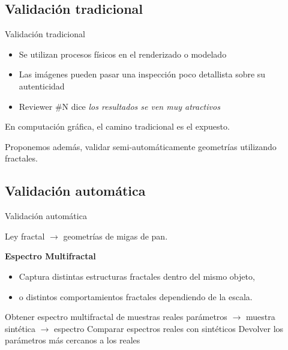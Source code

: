 \documentclass[spanish,unknownkeysallowed]{beamer}
\begin{document}
\subsection{Validación tradicional}
\begin{frame}{Validación tradicional}
\begin{itemize}
\item Se utilizan procesos físicos en el renderizado o modelado
\item Las imágenes pueden pasar una inspección poco detallista sobre su autenticidad
\item Reviewer \#N dice \it{los resultados se ven muy atractivos}
\end{itemize}

En computación gráfica, el camino tradicional es el expuesto.

Proponemos además, validar semi-automáticamente geometrías utilizando fractales.

\end{frame}

\subsection{Validación automática}

\begin{frame}{Validación automática}

Ley fractal $\rightarrow$ geometrías de migas de pan.

\textbf{Espectro Multifractal}

\begin{itemize}
\item Captura distintas estructuras fractales dentro del mismo objeto,
\item o distintos comportamientos fractales dependiendo de la escala.
\end{itemize}

\begin{algorithm}[H]
\begin{algorithmic}[1]
\STATE Obtener espectro multifractal de muestras reales
\STATE parámetros $\rightarrow$ muestra sintética $\rightarrow$ espectro
\STATE Comparar espectros reales con sintéticos
\ENDFOR
\STATE Devolver los parámetros más cercanos a los reales
\end{algorithmic}
\end{algorithm}
\end{frame}

\end{document}
